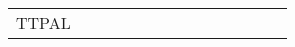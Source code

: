 \begin{tabular}{llllllllllllll}
	TTPAL & \cellcolor{emblyellow!75} &  & \cellcolor{emblgreen!75} & \cellcolor{emblpetrol!75} & \cellcolor{emblgreen!75} & \cellcolor{emblpetrol!75} & \cellcolor{emblyellow!75} & \cellcolor{emblpetrol!75} & \cellcolor{emblyellow!75} & \cellcolor{emblpetrol!75} & \cellcolor{emblpetrol!75} & \cellcolor{emblyellow!75} & \cellcolor{emblgreen!75}\\
\end{tabular}
